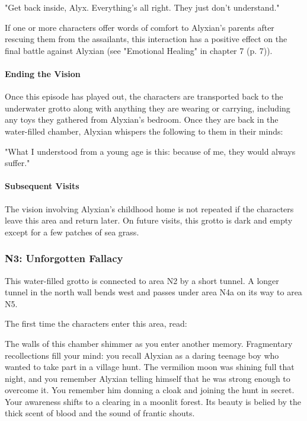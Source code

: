\documentclass[letterpaper, 11pt, bg=full, twocolumn]{dndbook}
\begin{document}
\begin{DndReadAloud}
"Get back inside, Alyx. Everything's all right. They just don't understand."
\end{DndReadAloud}

If one or more characters offer words of comfort to Alyxian's parents after rescuing them from the assailants, this interaction has a positive effect on the final battle against Alyxian (see "Emotional Healing" in chapter 7 (p. 7)).

\paragraph{Ending the Vision}

Once this episode has played out, the characters are transported back to the underwater grotto along with anything they are wearing or carrying, including any toys they gathered from Alyxian's bedroom. Once they are back in the water-filled chamber, Alyxian whispers the following to them in their minds:

\begin{DndReadAloud}
"What I understood from a young age is this: because of me, they would always suffer."
\end{DndReadAloud}

\paragraph{Subsequent Visits}

The vision involving Alyxian's childhood home is not repeated if the characters leave this area and return later. On future visits, this grotto is dark and empty except for a few patches of sea grass.

\subsubsection{N3: Unforgotten Fallacy}

This water-filled grotto is connected to area N2 by a short tunnel. A longer tunnel in the north wall bends west and passes under area N4a on its way to area N5.

The first time the characters enter this area, read:

\begin{DndReadAloud}
The walls of this chamber shimmer as you enter another memory. Fragmentary recollections fill your mind: you recall Alyxian as a daring teenage boy who wanted to take part in a village hunt. The vermilion moon was shining full that night, and you remember Alyxian telling himself that he was strong enough to overcome it. You remember him donning a cloak and joining the hunt in secret.
Your awareness shifts to a clearing in a moonlit forest. Its beauty is belied by the thick scent of blood and the sound of frantic shouts.
\end{DndReadAloud}
\end{document}
